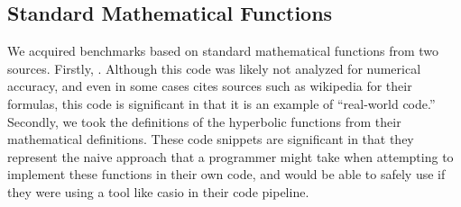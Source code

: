 \documentclass[paper.tex]{subfiles}
\begin{document}
\subsection{Standard Mathematical Functions}

We acquired benchmarks based on standard mathematical functions from two sources.
Firstly, .
Although this code was likely not analyzed for numerical accuracy,
and even in some cases cites sources such as wikipedia for their formulas,
this code is significant in that it is an example of ``real-world code.''
Secondly, we took the definitions of the hyperbolic functions from their mathematical definitions.
These code snippets are significant in that
they represent the naive approach that a programmer might take
when attempting to implement these functions in their own code,
and would be able to safely use if they were using a tool like casio
in their code pipeline.
\end{document}
